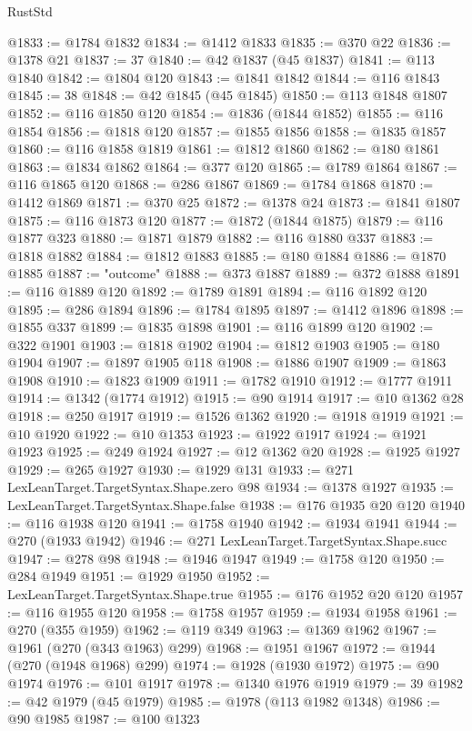 \begin{lexlean}{RustStd}
\begin{coremodule}
@1833 := @1784 @1832
@1834 := @1412 @1833
@1835 := @370 @22
@1836 := @1378 @21
@1837 := 37
@1840 := @42 @1837 (@45 @1837)
@1841 := @113 @1840
@1842 := @1804 @120
@1843 := @1841 @1842
@1844 := @116 @1843
@1845 := 38
@1848 := @42 @1845 (@45 @1845)
@1850 := @113 @1848 @1807
@1852 := @116 @1850 @120
@1854 := @1836 (@1844 @1852)
@1855 := @116 @1854
@1856 := @1818 @120
@1857 := @1855 @1856
@1858 := @1835 @1857
@1860 := @116 @1858 @1819
@1861 := @1812 @1860
@1862 := @180 @1861
@1863 := @1834 @1862
@1864 := @377 @120
@1865 := @1789 @1864
@1867 := @116 @1865 @120
@1868 := @286 @1867
@1869 := @1784 @1868
@1870 := @1412 @1869
@1871 := @370 @25
@1872 := @1378 @24
@1873 := @1841 @1807
@1875 := @116 @1873 @120
@1877 := @1872 (@1844 @1875)
@1879 := @116 @1877 @323
@1880 := @1871 @1879
@1882 := @116 @1880 @337
@1883 := @1818 @1882
@1884 := @1812 @1883
@1885 := @180 @1884
@1886 := @1870 @1885
@1887 := "outcome"
@1888 := @373 @1887
@1889 := @372 @1888
@1891 := @116 @1889 @120
@1892 := @1789 @1891
@1894 := @116 @1892 @120
@1895 := @286 @1894
@1896 := @1784 @1895
@1897 := @1412 @1896
@1898 := @1855 @337
@1899 := @1835 @1898
@1901 := @116 @1899 @120
@1902 := @322 @1901
@1903 := @1818 @1902
@1904 := @1812 @1903
@1905 := @180 @1904
@1907 := @1897 @1905 @118
@1908 := @1886 @1907
@1909 := @1863 @1908
@1910 := @1823 @1909
@1911 := @1782 @1910
@1912 := @1777 @1911
@1914 := @1342 (@1774 @1912)
@1915 := @90 @1914
@1917 := @10 @1362 @28
@1918 := @250 @1917
@1919 := @1526 @1362
@1920 := @1918 @1919
@1921 := @10 @1920
@1922 := @10 @1353
@1923 := @1922 @1917
@1924 := @1921 @1923
@1925 := @249 @1924
@1927 := @12 @1362 @20
@1928 := @1925 @1927
@1929 := @265 @1927
@1930 := @1929 @131
@1933 := @271 LexLeanTarget.TargetSyntax.Shape.zero @98
@1934 := @1378 @1927
@1935 := LexLeanTarget.TargetSyntax.Shape.false
@1938 := @176 @1935 @20 @120
@1940 := @116 @1938 @120
@1941 := @1758 @1940
@1942 := @1934 @1941
@1944 := @270 (@1933 @1942)
@1946 := @271 LexLeanTarget.TargetSyntax.Shape.succ
@1947 := @278 @98
@1948 := @1946 @1947
@1949 := @1758 @120
@1950 := @284 @1949
@1951 := @1929 @1950
@1952 := LexLeanTarget.TargetSyntax.Shape.true
@1955 := @176 @1952 @20 @120
@1957 := @116 @1955 @120
@1958 := @1758 @1957
@1959 := @1934 @1958
@1961 := @270 (@355 @1959)
@1962 := @119 @349
@1963 := @1369 @1962
@1967 := @1961 (@270 (@343 @1963) @299)
@1968 := @1951 @1967
@1972 := @1944 (@270 (@1948 @1968) @299)
@1974 := @1928 (@1930 @1972)
@1975 := @90 @1974
@1976 := @101 @1917
@1978 := @1340 @1976 @1919
@1979 := 39
@1982 := @42 @1979 (@45 @1979)
@1985 := @1978 (@113 @1982 @1348)
@1986 := @90 @1985
@1987 := @100 @1323

\end{coremodule}
\end{lexlean}
